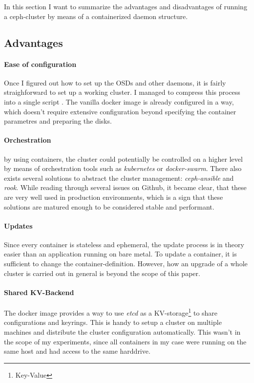 \documentclass[titlepage, a4paper, 11pt]{scrartcl}
\begin{document}
        In this section I want to summarize the advantages and disadvantages of running a ceph-cluster by means of a containerized daemon structure.

        \subsection{Advantages}

            \paragraph{Ease of configuration} Once I figured out how to set up the OSDs and other daemons, it is fairly straighforward to set up a working cluster. I managed to compress this process into a single script \cite{startupshatmaincodebaa}. The vanilla docker image is already configured in a way, which doesn't require extensive configuration beyond specifying the container parametres and preparing the disks.

            \paragraph{Orchestration} by using containers, the cluster could potentially be controlled on a higher level by means of orchestration tools such as \textit{kubernetes} or \textit{docker-swarm}. There also exists several solutions to abstract the cluster management: \textit{ceph-ansible}\cite{cephansible} and \textit{rook}\cite{RookDocs}. While reading through several issues on Github, it became clear, that these are very well used in production environments, which is a sign that these solutions are matured enough to be considered stable and performant.

            \paragraph{Updates} Since every container is stateless and ephemeral, the update process is in theory easier than an application running on bare metal. To update a container, it is sufficient to change the container-definition. However, how an upgrade of a whole cluster is carried out in general is beyond the scope of this paper.

            \paragraph{Shared KV-Backend} The docker image provides a way to use \textit{etcd} as a KV-storage\footnote{Key-Value} to share configurations and keyrings. This is handy to setup a cluster on multiple machines and distribute the cluster configuration automatically. This wasn't in the scope of my experiments, since all containers in my case were running on the same host and had access to the same harddrive.
\end{document}
